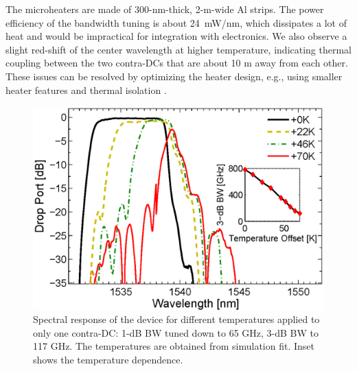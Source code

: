 \documentclass[9pt,twocolumn,twoside]{osajnl}
\begin{document}
The microheaters are made of 300-nm-thick, 2-\textmu m-wide Al strips.
The power efficiency of the bandwidth tuning is about 24~mW/nm, which dissipates a lot of heat and would be impractical for integration with electronics.
We also observe a slight red-shift of the center wavelength at higher temperature, indicating thermal coupling between the two contra-DCs that are about 10 \textmu m away from each other.
These issues can be resolved by optimizing the heater design, e.g., using smaller heater features and thermal isolation \cite{dong2010thermally}.



\begin{figure}[htbp]
\centering
\includegraphics[width=.99\columnwidth]{data/Band6}
\caption{Spectral response of the device for different temperatures applied to only one contra-DC: 1-dB BW tuned down to 65 GHz, 3-dB BW to 117 GHz. The temperatures are obtained from simulation fit. Inset shows the temperature dependence.}
\label{fig:bandTune}
\end{figure} 
\end{document}
